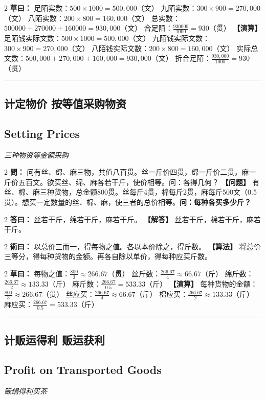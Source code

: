 \documentclass[11pt,a4paper]{article}
\newcommand{\longline}{\noindent\rule{\textwidth}{0.4pt}}
\newcommand{\bilingualProblem}[2]{%
  \vspace{0.6em}%
  \begin{paracol}{2}%
  \noindent\textcolor{problemcolor}{\textbf{問：}}#1%
  \switchcolumn%
  \noindent\textcolor{problemcolor}{\textbf{【问题】}}#2%
  \end{paracol}%
  \vspace{0.3em}%
}
\newcommand{\bilingualAnswer}[2]{%
  \begin{paracol}{2}%
  \noindent\textcolor{answercolor}{\textbf{答曰：}}#1%
  \switchcolumn%
  \noindent\textcolor{answercolor}{\textbf{【解答】}}#2%
  \end{paracol}%
  \vspace{0.3em}%
}
\newcommand{\bilingualMethod}[2]{%
  \begin{paracol}{2}%
  \noindent\textcolor{methodcolor}{\textbf{術曰：}}#1%
  \switchcolumn%
  \noindent\textcolor{methodcolor}{\textbf{【算法】}}#2%
  \end{paracol}%
  \vspace{0.3em}%
}
\newcommand{\bilingualWorking}[2]{%
  \begin{paracol}{2}%
  \noindent\textcolor{workingcolor}{\textbf{草曰：}}#1%
  \switchcolumn%
  \noindent\textcolor{workingcolor}{\textbf{【演算】}}#2%
  \end{paracol}%
  \vspace{0.3em}%
}
\newcommand{\bilingualSubsection}[2]{%
  \subsection{#1}
  \begin{center}
  {\small\color{sectioncolor}\textit{#2}}
  \end{center}
  \vspace{0.3em}
}
\begin{document}
\bilingualWorking{%
足陌实数：$500 \times 1000 = 500{,}000$（文）
九陌实数：$300 \times 900 = 270{,}000$（文）
八陌实数：$200 \times 800 = 160{,}000$（文）
总实数：$500000 + 270000 + 160000 = 930{,}000$（文）
合足陌：$\displaystyle\frac{930000}{1000} = 930$（贯）%
}{%
足陌钱实际文数：$500 \times 1000 = 500{,}000$（文）
九陌钱实际文数：$300 \times 900 = 270{,}000$（文）
八陌钱实际文数：$200 \times 800 = 160{,}000$（文）
实际总文数：$500{,}000 + 270{,}000 + 160{,}000 = 930{,}000$（文）
折合足陌：$\displaystyle\frac{930{,}000}{1000} = 930$（贯）%
}

\vspace{0.5em}
\longline

\subsection{计定物价 \quad 按等值采购物资}
\bilingualSubsection{Setting Prices}{三种物资等金额采购}

\bilingualProblem{%
问有丝、绵、麻三物，共值八百贯。丝一斤价四贯，绵一斤价二贯，麻一斤价五百文。欲买丝、绵、麻各若干斤，使价相等。问：各得几何？%
}{%
有丝、棉、麻三种货物，总金额800贯。丝每斤4贯，棉每斤2贯，麻每斤500文（0.5贯）。想买一定数量的丝、棉、麻，使三者的总价相等。\textbf{问：每种各买多少斤？}%
}

\bilingualAnswer{%
丝若干斤，绵若干斤，麻若干斤。%
}{%
丝若干斤，棉若干斤，麻若干斤。%
}

\bilingualMethod{%
以总价三而一，得每物之值。各以本价除之，得斤数。%
}{%
将总价三等分，得每种货物的金额。再各自除以单价，得每种应买斤数。%
}

\bilingualWorking{%
每物之值：$\displaystyle\frac{800}{3} \approx 266.67$（贯）
丝斤数：$\displaystyle\frac{266.67}{4} \approx 66.67$（斤）
绵斤数：$\displaystyle\frac{266.67}{2} \approx 133.33$（斤）
麻斤数：$\displaystyle\frac{266.67}{0.5} = 533.33$（斤）%
}{%
每种货物的金额：$\displaystyle\frac{800}{3} \approx 266.67$（贯）
丝应买：$\displaystyle\frac{266.67}{4} \approx 66.67$（斤）
棉应买：$\displaystyle\frac{266.67}{2} \approx 133.33$（斤）
麻应买：$\displaystyle\frac{266.67}{0.5} = 533.33$（斤）%
}

\vspace{0.5em}
\longline

\subsection{计贩运得利 \quad 贩运获利}
\bilingualSubsection{Profit on Transported Goods}{贩绢得利买茶}
\end{document}
